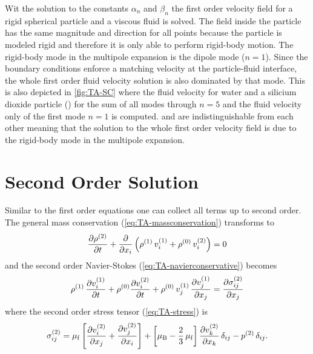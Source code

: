 Wit the solution to the constants $\alpha_{n}$ and $\beta_{n}$ the first order 
velocity field for a rigid spherical particle and a viscous fluid is solved. 
The field inside the particle has the same magnitude and direction for all 
points because the particle is modeled rigid and therefore it is only able to 
perform rigid-body motion. The rigid-body mode in the multipole expansion is 
the dipole mode ($n=1$). Since the boundary conditions enforce a matching 
velocity at the particle-fluid interface, the whole first order fluid velocity 
solution is also dominated by that mode. This is also depicted in 
\cref{fig:TA-SC} where the fluid velocity for water and a silicium dioxide 
particle (\SiO) for the sum of all modes through $n=5$ and the fluid velocity 
only of the first mode $n=1$ is computed.  and 
 are indistinguishable from each other meaning that the 
solution to the whole first order velocity field is due to the rigid-body mode 
in the multipole expansion.

\section{Second Order Solution\label{sec:TA-secondorder}}

Similar to the first order equations one can collect all terms up to second 
order. The general mass conservation (\cref{eq:TA-massconservation}) transforms 
to
\begin{equation}
  \pdv{  \rho^{(2)}  }{t} + \pdv{x_{i}}\left(\rho^{(1)}\,v_{i}^{(1)} 
  + \rho^{(0)}\,v_{i}^{(2)} \right) = 0
  \label{eq:TA-nd-massconservatio}
\end{equation}
and the second order Navier-Stokes (\cref{eq:TA-navierconservative}) becomes
\begin{equation}
  \rho^{(1)}\,\pdv{  v_{i}^{(1)}  }{t} + \rho^{(0)} 
  \pdv{  v_{i}^{(2)}  }{t} + 
  \rho^{(0)}\,v_{j}^{(1)}\,\pdv{  v_{j}^{(1)}  }{x_{j}} = 
  \pdv{  \sigma_{ij}^{(2)}  }{x_{j}}
  \label{eq:TA-nd-navier}
\end{equation}
where the second order stress tensor (\cref{eq:TA-stress}) is
\begin{equation}
  \sigma_{ij}^{(2)} = \mu_{\mathrm{f}}\left[ \pdv{  v_{i}^{(2)}  }{x_{j}} + 
  \pdv{  v_{j}^{(2)}  }{x_{i}} \right] + \left[ \mu_{\mathrm{B}} - 
  \frac{2}{3}\,\mu_{\mathrm{f}} \right] \pdv{  v_{k}^{(2)}  }{x_{k}} \,\delta_{ij} - 
  p^{(2)}\,\delta_{ij}.
  \label{eq:TA-nd-stress}
\end{equation}

